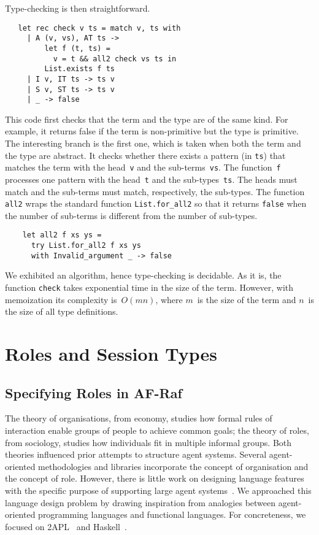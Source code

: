 \documentclass[a4paper,12pt,oneside,fleqn]{book} %
\theoremstyle{plain}
\theoremstyle{definition}
\theoremstyle{remark}
\newcommand{\rg}[1]{\marginpar{\tiny\raggedright\textcolor{blue}{\bf rg:} #1}}
\begin{document}
Type-checking is then straightforward.
\begin{verbatim}
   let rec check v ts = match v, ts with
     | A (v, vs), AT ts ->
         let f (t, ts) =
           v = t && all2 check vs ts in
         List.exists f ts
     | I v, IT ts -> ts v
     | S v, ST ts -> ts v
     | _ -> false
\end{verbatim}
This code first checks that the term and the type are of the same kind. For
example, it returns false if the term is non-primitive but the type is
primitive. The interesting branch is the first one, which is taken when
both the term and the type are abstract. It checks whether there exists a
pattern (in \verb|ts|) that matches the term with the head~\verb|v| and the
sub-terms~\verb|vs|. The function~\verb|f| processes one pattern with the
head~\verb|t| and the sub-types~\verb|ts|. The heads must match and the
sub-terms must match, respectively, the sub-types. The function \verb|all2|
wraps the standard function \verb|List.for_all2| so that it returns
\verb|false| when the number of sub-terms is different from the number of
sub-types.
\begin{verbatim}
    let all2 f xs ys =
      try List.for_all2 f xs ys
      with Invalid_argument _ -> false
\end{verbatim}

We exhibited an algorithm, hence type-checking is decidable. As it is, the
function \verb|check| takes exponential time in the size of the term.
However, with memoization its complexity is~$O(mn)$, where $m$~is the
size of the term and $n$~is the size of all type definitions.
\rg{Maybe expand a bit here, with some example?}

\section{Roles and Session Types} %

\subsection{Specifying Roles in AF-Raf} %

The theory of organisations, from economy, studies how formal rules of
interaction enable groups of people to achieve common goals; the theory of
roles, from sociology, studies how individuals fit in multiple informal
groups. Both theories influenced prior attempts to structure agent systems.
Several agent-oriented methodologies and libraries incorporate the concept
of organisation and the concept of role.  However, there is little work on
designing language features with the specific purpose of supporting large
agent systems~\cite{collier2005,DBLP:journals/entcs/BaldoniBT06}. We
approached this language design problem by drawing inspiration from analogies
between agent-oriented programming languages and functional languages. For
concreteness, we focused on 2APL~\cite{DBLP:journals/aamas/Dastani08} and
Haskell~\cite{web:haskell}.
\end{document}

